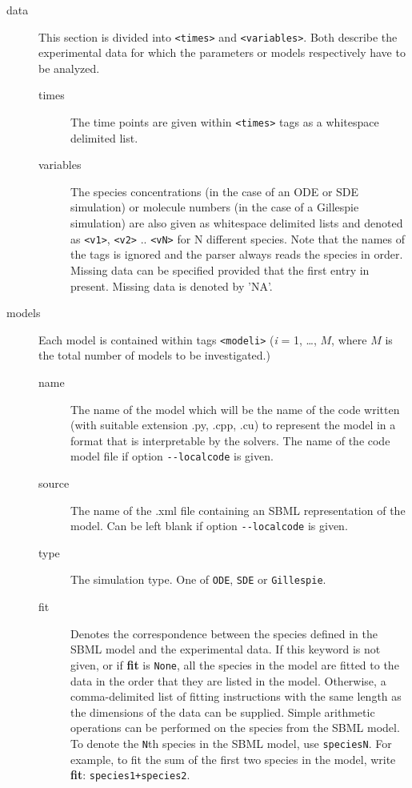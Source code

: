 \documentclass[a4paper]{report}
\begin{document}
\begin{description}
	\item[data] This section is divided into \verb$<times>$ and \verb$<variables>$. Both describe the experimental data for which the parameters or models respectively have to be analyzed. 
	\begin{description}
		\item[times]The time points are given within \verb$<times>$ tags as a whitespace delimited list. 
		\item[variables]The species concentrations (in the case of an ODE or SDE simulation) or molecule numbers (in the case of a Gillespie simulation) are also given as whitespace delimited lists and denoted as \verb$<v1>$, \verb$<v2>$ .. \verb$<vN>$ for N different species. Note that the names of the tags is ignored and the parser always reads the species in order. Missing data can be specified provided that the first entry in present. Missing data is denoted by 'NA'.
	\end{description}

	\item[models] Each model is contained within tags \verb$<modeli>$ ({\it i} = 1, \dots, $M$, where $M$ is the total number of models to be investigated.) 
	\begin{description}
		\item[name] The name of the model which will be the name of the code written (with suitable extension .py, .cpp, .cu) to represent the model in a format that is interpretable by the solvers.  The name of the code model file if option \verb$--localcode$ is given.
		\item[source] The name of the .xml file containing an SBML representation of the model. Can be left blank if option \verb$--localcode$ is given.
		\item[type] The simulation type. One of \verb$ODE$, \verb$SDE$ or \verb$Gillespie$.
		
		\item[fit] Denotes the correspondence between the species defined in the SBML model and the experimental data. If this keyword is not given, or if \textbf{fit} is \verb$None$, all the species in the model are fitted to the data in the order that they are listed in the model. Otherwise, a comma-delimited list of fitting instructions with the same length as the dimensions of the data can be supplied. Simple arithmetic operations can be performed on the species from the SBML model. To denote the \verb$N$th species in the SBML model, use \verb$speciesN$. For example, to fit the sum of the first two species in the model, write \textbf{fit}: \verb$species1+species2$.
		

\end{description}
\end{description}
\end{document}
